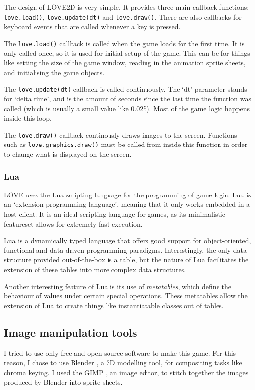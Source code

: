 \documentclass[11pt]{article}
\begin{document}
The design of L\"{O}VE2D is very simple. It provides three main callback functions: \texttt{love.load()}, \texttt{love.update(dt)} and \texttt{love.draw()}. There are also callbacks for keyboard events that are called whenever a key is pressed.

The \texttt{love.load()} callback is called when the game loads for the first time. It is only called once, so it is used for initial setup of the game. This can be for things like setting the size of the game window, reading in the animation sprite sheets, and initialising the game objects.

The \texttt{love.update(dt)} callback is called continuously. The `dt' parameter stands for `delta time', and is the amount of seconds since the last time the function was called (which is usually a small value like 0.025). Most of the game logic happens inside this loop.

The \texttt{love.draw()} callback continously draws images to the screen. Functions such as \texttt{love.graphics.draw()} must be called from inside this function in order to change what is displayed on the screen.

\subsubsection{Lua}
L\"{O}VE uses the Lua \cite{lua} scripting language for the programming of game logic. Lua is an `extension programming language', meaning that it only works embedded in a host client. It is an ideal scripting language for games, as its minimalistic featureset allows for extremely fast execution.

Lua is a dynamically typed language that offers good support for object-oriented, functional and data-driven programming paradigms. Interestingly, the only data structure provided out-of-the-box is a table, but the nature of Lua facilitates the extension of these tables into more complex data structures.

Another interesting feature of Lua is its use of \emph{metatables}, which define the behaviour of values under certain special operations. These metatables allow the extension of Lua to create things like instantiatable classes out of tables.

\subsection{Image manipulation tools}
I tried to use only free and open source software to make this game. For this reason, I chose to use Blender \cite{blender}, a 3D modelling tool, for compositing tasks like chroma keying. I used the GIMP \cite{gimp}, an image editor, to stitch together the images produced by Blender into sprite sheets.
\end{document}
